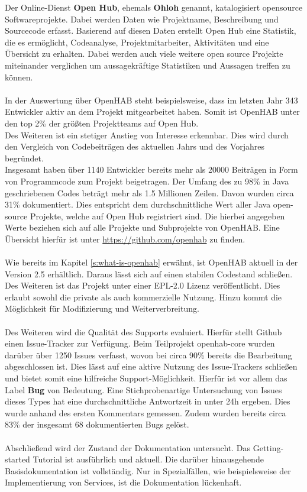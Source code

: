 Der Online-Dienst \textbf{Open Hub}, ehemals \textbf{Ohloh} genannt, katalogisiert opensource Softwareprojekte. Dabei werden Daten wie Projektname, Beschreibung und Sourcecode erfasst. Basierend auf diesen Daten erstellt Open Hub eine Statistik, die es ermöglicht, Codeanalyse, Projektmitarbeiter, Aktivitäten und eine Übersicht zu erhalten. Dabei werden auch viele weitere open source Projekte miteinander verglichen um aussagekräftige Statistiken und Aussagen treffen zu können.\\
\\
{In der Auswertung über OpenHAB steht beispielsweise, dass im letzten Jahr 343 Entwickler aktiv an dem Projekt mitgearbeitet haben. Somit ist OpenHAB unter den top 2\% der größten Projektteams auf Open Hub.\\
Des Weiteren ist ein stetiger Anstieg von Interesse erkennbar. Dies wird durch den Vergleich von Codebeiträgen des aktuellen Jahrs und des Vorjahres begründet.\\
Insgesamt haben über 1140 Entwickler bereits mehr als 20000 Beiträgen in Form von Programmcode zum Projekt beigetragen. Der Umfang des zu 98\% in Java geschriebenen Codes beträgt mehr als 1.5 Millionen Zeilen. Davon wurden circa 31\% dokumentiert. Dies entspricht dem durchschnittliche Wert aller Java open-source Projekte, welche auf Open Hub registriert sind.}\cite{OPENHUB01:OH} Die hierbei angegeben Werte beziehen sich auf alle Projekte und Subprojekte von OpenHAB. Eine Übersicht hierfür ist unter \url{https://github.com/openhab} zu finden.\\
\\
Wie bereits im Kapitel \ref{s:what-is-openhab} erwähnt, ist OpenHAB aktuell in der Version 2.5 erhältlich. Daraus lässt sich auf einen stabilen Codestand schließen.\\
Des Weiteren ist das Projekt unter einer EPL-2.0 Lizenz veröffentlicht. Dies erlaubt sowohl die private als auch kommerzielle Nutzung. Hinzu kommt die Möglichkeit für Modifizierung und Weiterverbreitung.\cite{LICENSE01:EC}
\\
\\
Des Weiteren wird die Qualität des Supports evaluiert. Hierfür stellt Github einen Issue-Tracker zur Verfügung. Beim Teilprojekt openhab-core wurden darüber über 1250 Issues verfasst, wovon bei circa 90\% bereits die Bearbeitung abgeschlossen ist.\cite{GITHUB01:OS} Dies lässt auf eine aktive Nutzung des Issue-Trackers schließen und bietet somit eine hilfreiche Support-Möglichkeit. Hierfür ist vor allem das Label \textbf{Bug} von Bedeutung. Eine Stichprobenartige Untersuchung von Issues dieses Types hat eine durchschnittliche Antwortzeit in unter 24h ergeben. Dies wurde anhand des ersten Kommentars gemessen. Zudem wurden bereits circa 83\% der insgesamt 68 dokumentierten Bugs gelöst.
\\
\\
Abschließend wird der Zustand der Dokumentation untersucht.
Das Getting-started Tutorial ist ausführlich und aktuell. Die darüber hinausgehende Basisdokumentation ist vollständig. Nur in Spezialfällen, wie beispielsweise der Implementierung von Services, ist die Dokumentation lückenhaft.\cite{OPENHAB01:OH}

